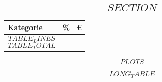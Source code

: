 


\subsection*{$$SECTION$$}

\begin{center}
    \footnotesize
    \begin{tabular}{l r r}
        Kategorie&\%&€\\
        \hline
        \hline
        $$TABLE_LINES$$
        \hline
        $$TABLE_TOTAL$$
    \end{tabular}
\end{center}

$$PLOTS$$

$$LONG_TABLE$$

\clearpage
